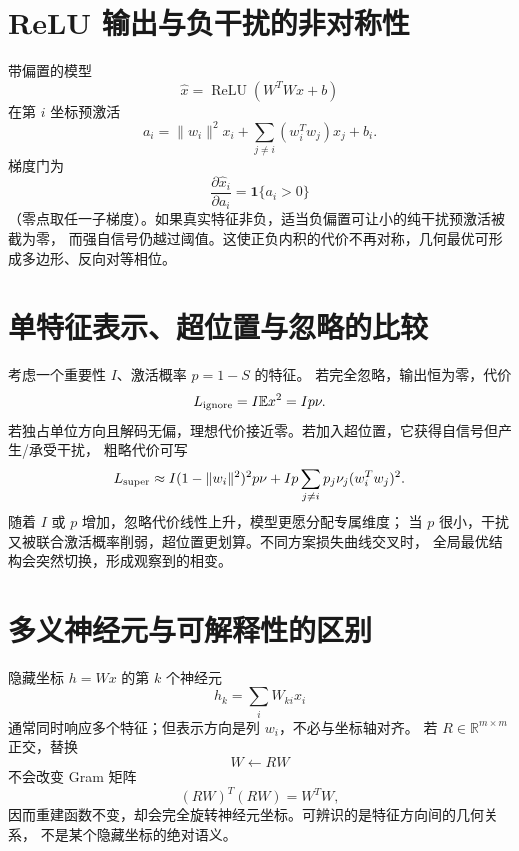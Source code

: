 \documentclass[11pt]{article}
\numberwithin{equation}{section}
\newcommand{\R}{\mathbb{R}}
\newcommand{\E}{\mathbb{E}}
\newcommand{\1}{\mathbf{1}}
\begin{document}
\section{ReLU 输出与负干扰的非对称性}

带偏置的模型
\begin{equation}
 \widehat x=\operatorname{ReLU}(W^TWx+b)
\end{equation}
在第 $i$ 坐标预激活
\begin{equation}
 a_i=\|w_i\|^2x_i+\sum_{j\ne i}(w_i^Tw_j)x_j+b_i.
\end{equation}
梯度门为
\begin{equation}
 \frac{\partial\widehat x_i}{\partial a_i}
 =\1\{a_i>0\}
\end{equation}
（零点取任一子梯度）。如果真实特征非负，适当负偏置可让小的纯干扰预激活被截为零，
而强自信号仍越过阈值。这使正负内积的代价不再对称，几何最优可形成多边形、反向对等相位。

\section{单特征表示、超位置与忽略的比较}

考虑一个重要性 $I$、激活概率 $p=1-S$ 的特征。
若完全忽略，输出恒为零，代价
\begin{equation}
 L_{\rm ignore}=I\E x^2=Ip\nu.
\end{equation}
若独占单位方向且解码无偏，理想代价接近零。若加入超位置，它获得自信号但产生/承受干扰，
粗略代价可写
\begin{equation}
 L_{\rm super}\approx I(1-\|w_i\|^2)^2p\nu
 +Ip\sum_{j\ne i}p_j\nu_j(w_i^Tw_j)^2.
\end{equation}
随着 $I$ 或 $p$ 增加，忽略代价线性上升，模型更愿分配专属维度；
当 $p$ 很小，干扰又被联合激活概率削弱，超位置更划算。不同方案损失曲线交叉时，
全局最优结构会突然切换，形成观察到的相变。

\section{多义神经元与可解释性的区别}

隐藏坐标 $h=Wx$ 的第 $k$ 个神经元
\begin{equation}
 h_k=\sum_iW_{ki}x_i
\end{equation}
通常同时响应多个特征；但表示方向是列 $w_i$，不必与坐标轴对齐。
若 $R\in\R^{m\times m}$ 正交，替换
\begin{equation}
 W\leftarrow RW
\end{equation}
不会改变 Gram 矩阵
\begin{equation}
 (RW)^T(RW)=W^TW,
\end{equation}
因而重建函数不变，却会完全旋转神经元坐标。可辨识的是特征方向间的几何关系，
不是某个隐藏坐标的绝对语义。
\end{document}
